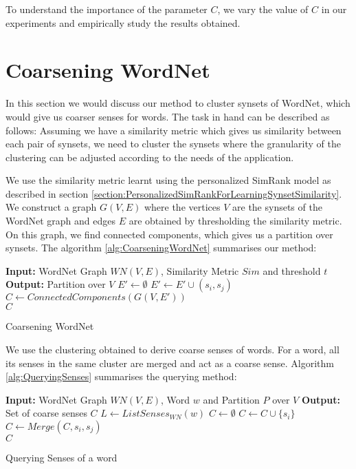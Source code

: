 To understand the importance of the parameter $C$, we vary the value of $C$ in our experiments and empirically study the results obtained.

\section{Coarsening WordNet}
In this section we would discuss our method to cluster synsets of WordNet, which would give us coarser senses for words. The task in hand can be described as follows: Assuming we have a similarity metric which gives us similarity between each pair of synsets, we need to cluster the synsets where the granularity of the clustering can be adjusted according to the needs of the application.

We use the similarity metric learnt using the personalized SimRank model as described in section \ref{section:PersonalizedSimRankForLearningSynsetSimilarity}.
We construct a graph $G(V,E)$ where the vertices $V$ are the synsets of the WordNet graph and edges $E$ are obtained by thresholding the similarity metric.
On this graph, we find connected components, which gives us a partition over synsets.
The algorithm \ref{alg:CoarseningWordNet} summarises our method:

\begin{algorithm}[h]
\begin{algorithmic}[1]
 \State \textbf{Input: } WordNet Graph $WN(V,E)$, Similarity Metric $Sim$ and threshold $t$
 \State \textbf{Output: } Partition over $V$ 
 \State $E' \gets \emptyset$
    $E' \gets E' \cup (s_i,s_j)$
    \EndIf
  \EndFor
 \EndFor 
 \State $C \gets ConnectedComponents(G(V,E'))$\\
 \Return $C$
\end{algorithmic}
\caption{Coarsening WordNet}
\label{alg:CoarseningWordNet}
\end{algorithm}

We use the clustering obtained to derive coarse senses of words. For a word, all its senses in the same cluster are merged and act as a coarse sense. Algorithm \ref{alg:QueryingSenses} summarises the querying method:

\begin{algorithm}[h]
\begin{algorithmic}[1]
 \State \textbf{Input: } WordNet Graph $WN(V,E)$, Word $w$ and Partition $P$ over $V$ 
 \State \textbf{Output: } Set of coarse senses $C$
 \State $L \gets ListSenses_{WN}(w)$
 \State $C \gets \emptyset$
  \State $C \gets C \cup \{s_i\}$
 \EndFor 
    $C \gets Merge(C,s_i,s_j)$
    \EndIf
  \EndFor
 \EndFor  \\
\Return $C$
\end{algorithmic}
\caption{Querying Senses of a word}
\label{alg:QueryingSenses}
\end{algorithm}

